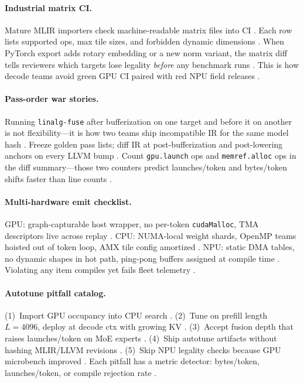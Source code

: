 \paragraph{Industrial matrix CI.} Mature MLIR importers check machine-readable matrix files into CI \citep{yirage2026,chen2020compilerbasedhardw}. Each row lists supported ops, max tile sizes, and forbidden dynamic dimensions \citep{amd2024xdna,kwon2023vllm}. When PyTorch export adds rotary embedding or a new norm variant, the matrix diff tells reviewers which targets lose legality \emph{before} any benchmark runs \citep{patel2025llminference,liu2024deepseekv3}. This is how decode teams avoid green GPU CI paired with red NPU field releases \citep{memoryfloor2026,taxbreak2026}.

\paragraph{Pass-order war stories.} Running \texttt{linalg-fuse} after bufferization on one target and before it on another is not flexibility---it is how two teams ship incompatible IR for the same model hash \citep{yirage2026,chen2020compilerbasedhardw}. Freeze golden pass lists; diff IR at post-bufferization and post-lowering anchors on every LLVM bump \citep{liu2024deepseekv3,taxbreak2026}. Count \texttt{gpu.launch} ops and \texttt{memref.alloc} ops in the diff summary---those two counters predict launches/token and bytes/token shifts faster than line counts \citep{memoryfloor2026,nvidia2024cudagraphs}.

\paragraph{Multi-hardware emit checklist.} GPU: graph-capturable host wrapper, no per-token \texttt{cudaMalloc}, TMA descriptors live across replay \citep{nvidia2024cudagraphs,semianalysis2024tma}. CPU: NUMA-local weight shards, OpenMP teams hoisted out of token loop, AMX tile config amortized \citep{dlbook,kwon2023vllm}. NPU: static DMA tables, no dynamic shapes in hot path, ping-pong buffers assigned at compile time \citep{amd2024aie,amd2024xdna}. Violating any item compiles yet fails fleet telemetry \citep{patel2025llminference,yirage2026}.

\paragraph{Autotune pitfall catalog.} (1)~Import GPU occupancy into CPU search \citep{dlbook}. (2)~Tune on prefill length $L{=}4096$, deploy at decode ctx with growing KV \citep{memoryfloor2026}. (3)~Accept fusion depth that raises launches/token on MoE experts \citep{taxbreak2026,liu2024deepseekv3}. (4)~Ship autotune artifacts without hashing MLIR/LLVM revisions \citep{chen2020compilerbasedhardw}. (5)~Skip NPU legality checks because GPU microbench improved \citep{amd2024xdna,yirage2026}. Each pitfall has a metric detector: bytes/token, launches/token, or compile rejection rate \citep{patel2025llminference,taxbreak2026}.

